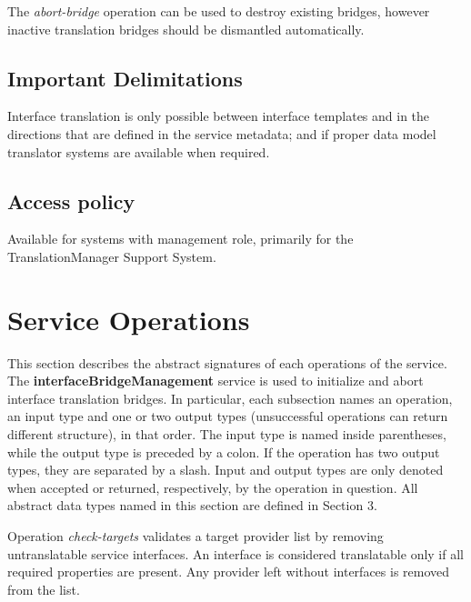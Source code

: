 \documentclass[a4paper]{arrowhead}
\begin{document}
The \textit{abort-bridge} operation can be used to destroy existing bridges, however inactive translation bridges should be dismantled automatically.

\subsection{Important Delimitations}
\label{sec:delimitations}

Interface translation is only possible between interface templates and in the directions that are defined in the service metadata; and if proper data model translator systems are available when required.  

\subsection{Access policy}
\label{sec:accesspolicy}

Available for systems with management role, primarily for the TranslationManager Support System.

\newpage

\section{Service Operations}
\label{sec:functions}

This section describes the abstract signatures of each operations of the service. The \textbf{interfaceBridgeManagement} service is used to initialize  and abort interface translation bridges.
In particular, each subsection names an operation, an input type and one or two output types (unsuccessful operations can return different structure), in that order.
The input type is named inside parentheses, while the output type is preceded by a colon. If the operation has two output types, they are separated by a slash.
Input and output types are only denoted when accepted or returned, respectively, by the operation in question. All abstract data types named in this section are defined in Section 3.

{}

Operation \textit{check-targets} validates a target provider list by removing untranslatable service interfaces. An interface is considered translatable only if all required properties are present. Any provider left without interfaces is removed from the list.
\end{document}
